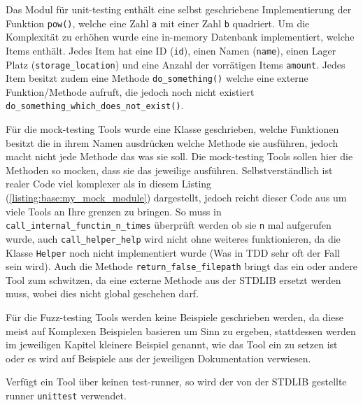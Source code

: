 Das Modul für unit-testing enthält eine selbst geschriebene Implementierung der Funktion \lstinline|pow()|,
welche eine Zahl \lstinline|a| mit einer Zahl \lstinline|b| quadriert. Um die Komplexität
zu erhöhen wurde eine in-memory Datenbank implementiert, welche Items enthält. Jedes Item 
hat eine ID (\lstinline|id|), einen Namen (\lstinline|name|), einen Lager Platz
(\lstinline|storage_location|) und eine Anzahl der vorrätigen Items \lstinline|amount|.
Jedes Item besitzt zudem eine Methode \lstinline|do_something()| welche eine externe
Funktion/Methode aufruft, die jedoch noch nicht existiert
\lstinline|do_something_which_does_not_exist()|.

Für die \gls{mock}-testing Tools wurde eine Klasse geschrieben, welche Funktionen besitzt
die in ihrem Namen ausdrücken welche Methode sie ausführen, jedoch macht nicht jede Methode
das was sie soll. Die \gls{mock}-testing Tools sollen hier die Methoden so \gls{mock}en, dass
sie das jeweilige ausführen. Selbstverständlich ist realer Code viel komplexer als in diesem
Listing (\ref{listing:base:my_mock_module}) dargestellt, jedoch reicht dieser Code aus um viele
Tools an Ihre grenzen zu bringen. So muss in \lstinline{call_internal_functin_n_times} überprüft
werden ob sie \lstinline{n} mal aufgerufen wurde, auch \lstinline{call_helper_help} wird nicht
ohne weiteres funktionieren, da die Klasse \lstinline{Helper} noch nicht implementiert wurde
(Was in TDD sehr oft der Fall sein wird). Auch die Methode \lstinline{return_false_filepath}
bringt das ein oder andere Tool zum schwitzen, da eine externe Methode aus der STDLIB ersetzt
werden muss, wobei dies nicht global geschehen darf.

Für die Fuzz-testing Tools werden keine Beispiele geschrieben werden, da diese meist auf Komplexen
Beispielen basieren um Sinn zu ergeben, stattdessen werden im jeweiligen Kapitel kleinere Beispiel
genannt, wie das Tool ein zu setzen ist oder es wird auf Beispiele aus der jeweiligen Dokumentation
verwiesen.

Verfügt ein Tool über keinen test-runner, so wird der von der STDLIB gestellte runner
\lstinline{unittest} verwendet.







